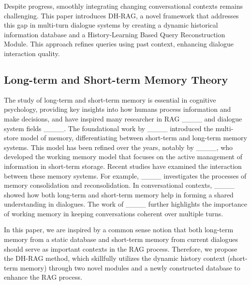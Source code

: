 Despite progress, smoothly integrating changing conversational contexts remains challenging. This paper introduces DH-RAG, a novel framework that addresses this gap in multi-turn dialogue systems by creating a dynamic historical information database and a History-Learning Based Query Reconstruction Module. This approach refines queries using past context, enhancing dialogue interaction quality.

\subsection{Long-term and Short-term Memory Theory} 

The study of long-term and short-term memory is essential in cognitive psychology, providing key insights into how humans process information and make decisions, and have inspired many researcher in RAG ____ and dialogue system fields ____. The foundational work by ____ introduced the multi-store model of memory, differentiating between short-term and long-term memory systems. This model has been refined over the years, notably by ____, who developed the working memory model that focuses on the active management of information in short-term storage. Recent studies have examined the interaction between these memory systems. For example, ____ investigates the processes of memory consolidation and reconsolidation. In conversational contexts, ____ showed how both long-term and short-term memory help in forming a shared understanding in dialogues. The work of ____ further highlights the importance of working memory in keeping conversations coherent over multiple turns.

In this paper, we are inspired by a common sense notion that both long-term memory from a static database and short-term memory from current dialogues should serve as important contexts in the RAG process. Therefore, we propose the DH-RAG method, which skillfully utilizes the dynamic history context (short-term memory) through two novel modules and a newly constructed database to enhance the RAG process.